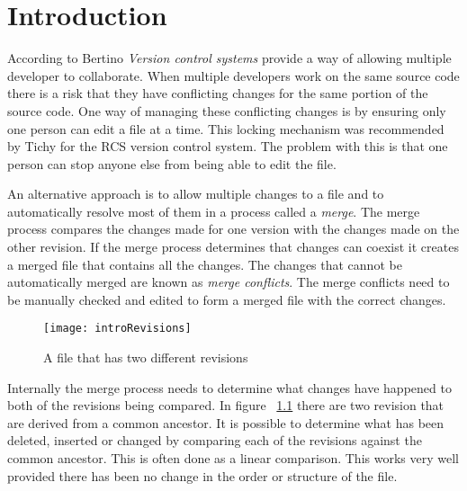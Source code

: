 
\chapter{Introduction}\label{C:intro}

According to Bertino \cite{Bertino2012} \emph{Version control systems} provide a way of allowing multiple developer to collaborate. When multiple developers work on the same source code there is a risk that they have conflicting changes for the same portion of the source code.  One way of managing these conflicting changes is by ensuring only one person can edit a file at a time. This locking mechanism was recommended by Tichy \cite{Tichy1982} for the RCS version control system. The problem with this is that one person can stop anyone else from being able to edit the file. 

An alternative approach is to allow multiple changes to a file and to automatically resolve most of them in a process called a \emph{merge}.  The merge process compares the changes made for one version with the changes made on the other revision. If the merge process determines that changes can coexist it creates a merged file that contains all the changes. The changes that cannot be automatically merged are known as \emph{merge conflicts}.  The merge conflicts need to be manually checked and edited to form a merged file with the correct changes.

\begin{figure}[h]
 \begin{center}
 \texttt{[image: introRevisions]}
 \end{center}
 \caption{A file that has two different revisions}
 \label{fig:introRevisions}
\end{figure}


Internally the merge process needs to determine what changes have happened to both of the revisions being compared. In figure  ~\ref{fig:introRevisions} there are two revision that are derived from a common ancestor. It is possible to determine what has been deleted, inserted or changed by comparing each of the revisions against the common ancestor.  This is often done as a linear comparison. This works very well provided there has been no change in the order or structure of the file.

